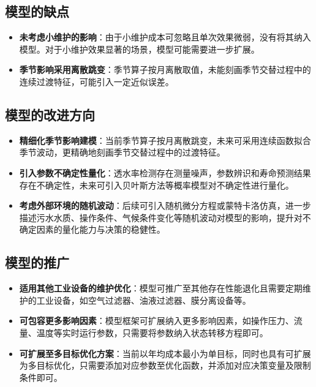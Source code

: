 \documentclass[withoutpreface,bwprint]{cumcmthesis}
\begin{document}
\subsection{模型的缺点}

\begin{itemize}
	\item \textbf{未考虑小维护的影响}：由于小维护成本可忽略且单次效果微弱，没有将其纳入模型。对于小维护效果显著的场景，模型可能需要进一步扩展。
	
	\item \textbf{季节影响采用离散跳变}：季节算子按月离散取值，未能刻画季节交替过程中的连续过渡特征，可能引入一定近似误差。
\end{itemize}

\subsection{模型的改进方向}

\begin{itemize}
	\item \textbf{精细化季节影响建模}：当前季节算子按月离散跳变，未来可采用连续函数拟合季节波动，更精确地刻画季节交替过程中的过渡特征。
	
	\item \textbf{引入参数不确定性量化}：透水率检测存在测量噪声，参数辨识和寿命预测结果存在不确定性，未来可引入贝叶斯方法等概率模型对不确定性进行量化。
	
	\item \textbf{考虑外部环境的随机波动}：后续可引入随机微分方程或蒙特卡洛仿真，进一步描述污水水质、操作条件、气候条件变化等随机波动对模型的影响，提升对不确定因素的量化能力与决策的稳健性。
	
\end{itemize}

\subsection{模型的推广}

\begin{itemize}
	\item \textbf{适用其他工业设备的维护优化}：模型可推广至其他存在性能退化且需要定期维护的工业设备，如空气过滤器、油液过滤器、膜分离设备等。
	
	\item \textbf{可包容更多影响因素}：模型框架可扩展纳入更多影响因素，如操作压力、流量、温度等实时运行参数，只需要将参数纳入状态转移方程即可。
	
	\item \textbf{可扩展至多目标优化方案}：当前以年均成本最小为单目标，同时也具有可扩展为多目标优化，只需要添加对应参数至优化函数，并添加对应决策变量及限制条件即可。
\end{itemize}
\end{document}

